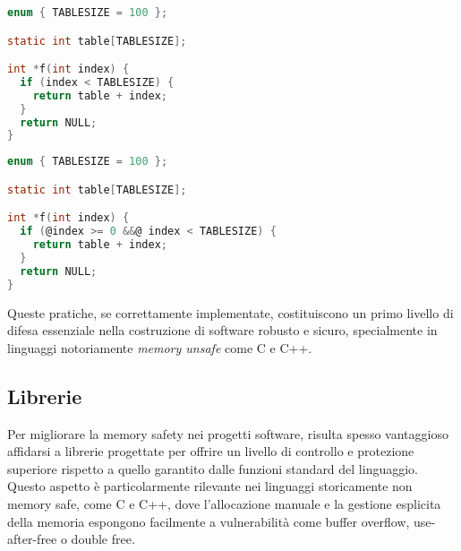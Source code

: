 \begin{minipage}[t]{0.4\textwidth}
  \begin{lstlisting}[language=C, caption={Codice \textit{Non-Compliant}}, label={lst:non-compliant}]
enum { TABLESIZE = 100 };

static int table[TABLESIZE];

int *f(int index) {
  if (index < TABLESIZE) {
    return table + index;
  }
  return NULL;
}
\end{lstlisting}
\end{minipage}
\hfill
\begin{minipage}[t]{0.5\textwidth}
  \begin{lstlisting}[language=C, caption={Codice \textit{Compliant}}, label={lst:compliant}, style=changes_in_c]
enum { TABLESIZE = 100 };

static int table[TABLESIZE];

int *f(int index) {
  if (@index >= 0 &&@ index < TABLESIZE) {
    return table + index;
  }
  return NULL;
}
\end{lstlisting}
\end{minipage}

\medskip
\noindent
Queste pratiche, se correttamente implementate, costituiscono un primo livello di
difesa essenziale nella costruzione di software robusto e sicuro, specialmente
in linguaggi notoriamente \textit{memory unsafe} come C e C++.

\subsection{Librerie}
\label{sec:librerie}

Per migliorare la memory safety nei progetti software, risulta spesso vantaggioso
affidarsi a librerie progettate per offrire un livello di controllo e protezione
superiore rispetto a quello garantito dalle funzioni standard del linguaggio.
Questo aspetto è particolarmente rilevante nei linguaggi storicamente non memory
safe, come C e C++, dove l'allocazione manuale e la gestione esplicita della
memoria espongono facilmente a vulnerabilità come buffer overflow, use-after-free
o double free.

